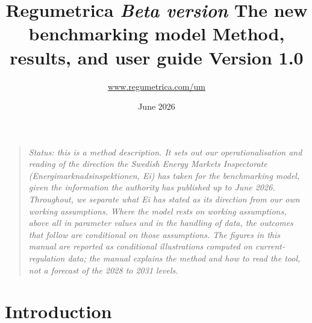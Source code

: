 
\graphicspath{ {../../../graphs/} }
\makeatletter
{}
\makeatother

\DeclareMathOperator{\clip}{clip}
\renewcommand{\refname}{References}



\title{Regumetrica \linebreak \emph{Beta version} \linebreak The new benchmarking model \linebreak Method, results, and user guide \linebreak Version 1.0 \\}
\author{\href{https://www.regumetrica.com/um}{www.regumetrica.com/um}}
\date{June 2026}
\maketitle
\setcounter{page}{1}

\begin{quote}\itshape\small
Status: this is a method description. It sets out our operationalisation and reading of the
direction the Swedish Energy Markets Inspectorate (Energimarknadsinspektionen, Ei) has taken
for the benchmarking model, given the information the authority has published up to June 2026.
Throughout, we separate what Ei has stated as its direction from our own working assumptions.
Where the model rests on working assumptions, above all in parameter values and in the handling
of data, the outcomes that follow are conditional on those assumptions. The figures in this
manual are reported as conditional illustrations computed on current-regulation data; the manual
explains the method and how to read the tool, not a forecast of the 2028 to 2031 levels.
\end{quote}

\tableofcontents
\newpage

\section{Introduction}


